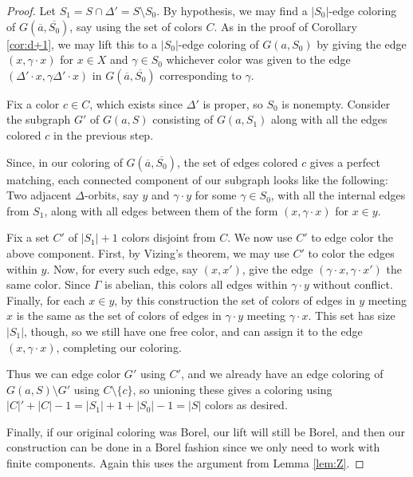 \documentclass[10pt,a4paper]{article}
\newcommand{\0}{\varnothing}
\begin{document}
\begin{proof}
Let $S_1 = S \cap \Delta' = S \setminus S_0$. By hypothesis, we may find a $|S_0|$-edge coloring of $G(\overline{a},\overline{S_0})$, say using the set of colors $C$. As in the proof of Corollary \ref{cor:d+1}, we may lift this to a $|S_0|$-edge coloring of $G(a,S_0)$ by giving the edge $(x,\gamma \cdot x)$ for $x \in X$ and $\gamma \in S_0$ whichever color was given to the edge $(\Delta' \cdot x, \gamma \Delta' \cdot x)$ in $G(\overline{a},\overline{S_0})$ corresponding to $\gamma$.


Fix a color $c \in C$, which exists since $\Delta'$ is proper, so $S_0$ is nonempty. Consider the subgraph $G'$ of $G(a,S)$ consisting of $G(a,S_1)$ along with all the edges colored $c$ in the previous step. 

Since, in our coloring of $G(\overline{a},\overline{S_0})$, the set of edges colored $c$ gives a perfect matching, each connected component of our subgraph looks like the following: Two adjacent $\Delta$-orbits, say $y$ and $\gamma \cdot y$ for some $\gamma \in S_0$, with all the internal edges from $S_1$, along with all edges between them of the form $(x,\gamma \cdot x)$ for $x \in y$.

Fix a set $C'$ of $|S_1|+1$ colors disjoint from $C$. We now use $C'$ to edge color the above component. First, by Vizing's theorem, we may use $C'$ to color the edges within $y$. Now, for every such edge, say $(x,x')$, give the edge $(\gamma \cdot x, \gamma \cdot x')$ the same color. Since $\Gamma$ is abelian, this colors all edges within $\gamma \cdot y$ without conflict. Finally, for each $x \in y$, by this construction the set of colors of edges in $y$ meeting $x$ is the same as the set of colors of edges in $\gamma \cdot y$ meeting $\gamma \cdot x$. This set has size $|S_1|$, though, so we still have one free color, and can assign it to the edge $(x,\gamma \cdot x)$, completing our coloring.

Thus we can edge color $G'$ using $C'$, and we already have an edge coloring of $G(a,S) \setminus G'$ using $C \setminus \{c\}$, so unioning these gives a coloring using $|C|'+|C|-1 = |S_1|+1 + |S_0| - 1 = |S|$ colors as desired.

Finally, if our original coloring was Borel, our lift will still be Borel, and then our construction can be done in a Borel fashion since we only need to work with finite components. Again this uses the argument from Lemma \ref{lem:Z}.
\end{proof}
\end{document}
